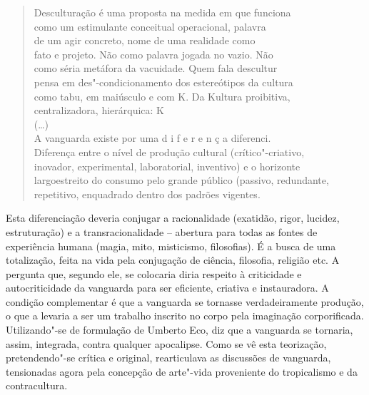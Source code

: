 \begin{quote}
Desculturação é uma proposta na medida em que \qb{}funciona\\
como um estimulante conceitual operacional, palavra\\
de um agir concreto, nome de uma realidade como\\
fato e projeto. Não como palavra jogada no vazio. Não\\
como séria metáfora da vacuidade. Quem fala \qb{}descultur\\
pensa em des"-condicionamento dos estereótipos da cultura\\
como tabu, em maiúsculo e com K. Da Kultura proibitiva,\\
centralizadora, hierárquica: K\\
(\ldots{})\\
A vanguarda existe por uma d i f e r e n ç a \qb{}diferenci.\\
Diferença entre o nível de produção cultural \qb{}(crítico"-criativo,\\
inovador, experimental, laboratorial, inventivo) e o \qb{}horizonte\\
largoestreito do consumo pelo grande público (passivo, \qb{}redundante,\\
repetitivo, enquadrado dentro dos padrões vigentes.
\end{quote}

Esta diferenciação deveria conjugar a racionalidade (exatidão, rigor,
lucidez, estruturação) e a transracionalidade -- abertura para todas as
fontes de experiência humana (magia, mito, misticismo, filosofias). É a
busca de uma totalização, feita na vida pela conjugação de ciência,
filosofia, religião etc. A pergunta que, segundo ele, se colocaria diria
respeito à criticidade e autocriticidade da vanguarda para ser
eficiente, criativa e instauradora. A condição complementar é que a
vanguarda se tornasse verdadeiramente produção, o que a levaria a ser um
trabalho inscrito no corpo pela imaginação corporificada. Utilizando"-se
de formulação de Umberto Eco, diz que a vanguarda se tornaria, assim,
integrada, contra qualquer apocalipse. Como se vê esta teorização,
pretendendo"-se crítica e original, rearticulava as discussões de
vanguarda, tensionadas agora pela concepção de arte"-vida proveniente do
tropicalismo e da contracultura.

